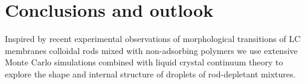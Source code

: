 




\section{Conclusions and outlook}

Inspired by recent experimental observations of morphological transitions of LC membranes colloidal rods mixed with non-adsorbing polymers we use extensive  Monte Carlo simulations combined with liquid crystal continuum theory to  explore the shape and internal structure of droplets of rod-depletant mixtures.

